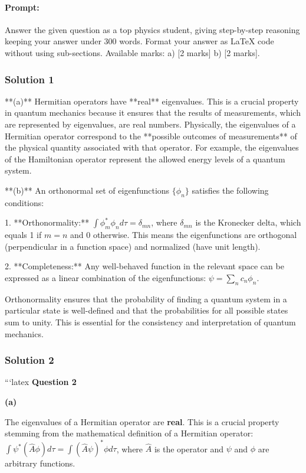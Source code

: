 \documentclass{article}
\begin{document}
\paragraph{Prompt: \\} 
Answer the given question as a top physics student, giving step-by-step reasoning keeping your answer under 300 words. Format your answer as LaTeX code without using sub-sections. Available marks: a) [2 marks] b) [2 marks].

\subsubsection{Solution 1}
**(a)** Hermitian operators have **real** eigenvalues.  This is a crucial property in quantum mechanics because it ensures that the results of measurements, which are represented by eigenvalues, are real numbers.  Physically, the eigenvalues of a Hermitian operator correspond to the **possible outcomes of measurements** of the physical quantity associated with that operator. For example, the eigenvalues of the Hamiltonian operator represent the allowed energy levels of a quantum system.
\newline

**(b)** An orthonormal set of eigenfunctions $\{\phi_n\}$ satisfies the following conditions:

1.  **Orthonormality:**  
    $\int \phi_m^* \phi_n d\tau = \delta_{mn}$, where $\delta_{mn}$ is the Kronecker delta, which equals 1 if $m=n$ and 0 otherwise. This means the eigenfunctions are orthogonal (perpendicular in a function space) and normalized (have unit length).

2.  **Completeness:** Any well-behaved function in the relevant space can be expressed as a linear combination of the eigenfunctions: $\psi = \sum_n c_n \phi_n$.

Orthonormality ensures that the probability of finding a quantum system in a particular state is well-defined and that the probabilities for all possible states sum to unity. This is essential for the consistency and interpretation of quantum mechanics.


\subsubsection{Solution 2}
```latex
\textbf{Question 2}

\textbf{(a)} 

The eigenvalues of a Hermitian operator are \textbf{real}. This is a crucial property stemming from the mathematical definition of a Hermitian operator:  $\int \psi^* (\hat{A} \phi) d\tau = \int (\hat{A} \psi)^* \phi d\tau$, where $\hat{A}$ is the operator and $\psi$ and $\phi$ are arbitrary functions.
\end{document}
